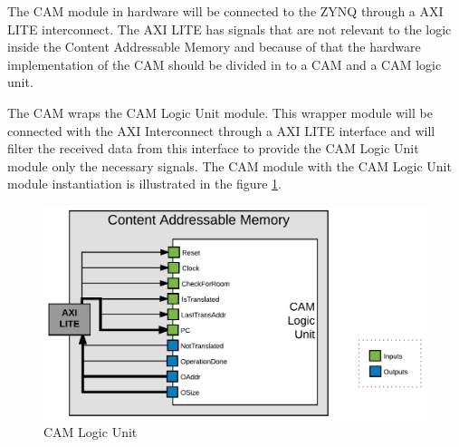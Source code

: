 The CAM module in hardware will be connected to the ZYNQ through a AXI LITE interconnect. The AXI LITE has signals that are not relevant to the logic inside the Content Addressable Memory and because of that the hardware implementation of the CAM should be divided in to a CAM and a CAM logic unit.

The CAM wraps the CAM Logic Unit module. This wrapper module will be connected with the AXI Interconnect through a AXI LITE interface and will filter the received data from this interface to provide the CAM Logic Unit module only the necessary signals. The CAM module with the CAM Logic Unit module instantiation is illustrated in the figure \ref{fig:CAM_HwLogic}.

\begin{figure} [H]
	\centering
	\includegraphics[scale = 0.25]{images/CAM_HwLogic.png}
	\caption{CAM Logic Unit}
	\label{fig:CAM_HwLogic}
\end{figure}

